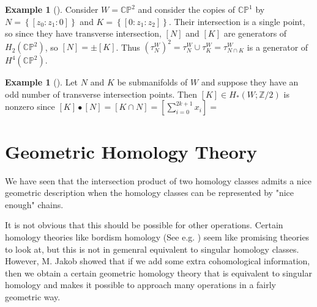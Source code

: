 \documentclass[reqno]{amsart}
\theoremstyle{definition}
\newtheorem{example}[theorem]{Example}
\theoremstyle{remark}
\begin{document}
      \begin{example}[]
          Consider $W = \mathbb{C}\mathbb{P}^2$ and
          consider the copies
          of $\mathbb{C}\mathbb{P}^{1}$ by
          $N = \left\{ \left[ z_0: z_1 : 0 \right]  \right\} $ and
          $K = \left\{ \left[ 0 : z_1 : z_2 \right]  \right\} $.
          Their intersection is a single point, so
          since they have transverse intersection,
          $\left[ N \right] $ and
          $\left[ K \right] $ are generators of
          $H_2\left( \mathbb{C}\mathbb{P}^2 \right) $, so
          $\left[ N \right] = \pm \left[ K \right] $.
           Thus $\left( \tau_N^{W} \right)^2 = 
           \tau_N^{W} \cup \tau_K^{W} = 
           \tau_{N \cap K}^{W}$ is a generator
           of $H^{4}\left( \mathbb{C}\mathbb{P}^2 \right) $.
      \end{example}

      \begin{example}[]
          Let $N$ and $K$ be submanifolds of
          $W$ and suppose they have an odd number of transverse
          intersection points. Then
          $\left[ K \right] \in H_* \left( W; \mathbb{Z}/2 \right) $ is
          nonzero since
          $\left[ K \right] \bullet  \left[ N \right] 
          = \left[ K \cap N \right] = 
          \left[ \sum_{i=0}^{2k+1} x_i \right] 
          = $
      \end{example}


















\newpage



\section{Geometric Homology Theory}

We have seen that the intersection product of two homology classes
admits a nice geometric description when the homology classes can be
represented by "nice enough" chains.


It is not obvious that this should be possible
for other operations. 
Certain homology theories like bordism homology (See e.g. \cite{Dieck})
seem like promising theories to look at, but
this is not in gemenral equivalent
to singular homology classes.
However, M. Jakob showed that if we add
some extra cohomological information, then
we obtain a certain geometric homology theory that is equivalent
to singular homology and
 makes it possible to approach
many operations in a fairly geometric way.
\end{document}
